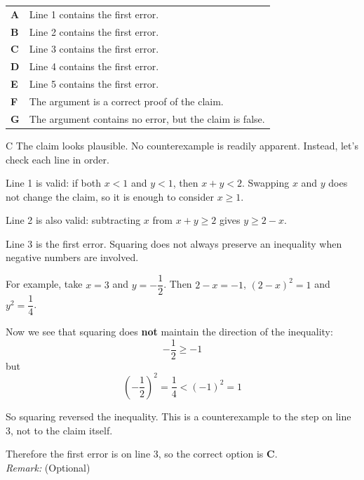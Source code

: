 \documentclass[11pt,a4paper]{article}
\begin{document}
\begin{enumerate}[label=\textbf{\arabic*.},leftmargin=*,itemsep=0pt,start=1]
\par\vspace*{12pt}
\begin{tabularx}{\linewidth}{@{}>{\bfseries}l Y@{}}
A &
Line 1 contains the first error.
\\[0.8em]
B &
Line 2 contains the first error.
\\[0.8em]
C &
Line 3 contains the first error.
\\[0.8em]
D &
Line 4 contains the first error.
\\[0.8em]
E &
Line 5 contains the first error.
\\[0.8em]
F &
The argument is a correct proof of the claim.
\\[0.8em]
G &
The argument contains no error, but the claim is false.
\\
\end{tabularx}

\begin{djsSolution}{C}
The claim looks plausible. No counterexample is readily apparent. Instead, let's check each line in order.

Line 1 is valid: if both $x<1$ and $y<1$, then $x+y<2$. Swapping $x$ and $y$ does not change the claim, so it is enough to consider $x\geq1$. 

Line 2 is also valid: subtracting $x$ from $x+y\geq2$ gives $y\geq2-x$.

Line 3 is the first error. Squaring does not always preserve an inequality when negative numbers are involved. 

For example, take $x=3$ and $y=-\dfrac12$. Then $2-x=-1$, $(2-x)^2=1$ and $y^2=\dfrac{1}{4}$.

Now we see that squaring does \textbf{not} maintain the direction of the inequality:
\[
-\dfrac12\geq-1\]
but
\[
\left(-\dfrac{1}{2}\right)^2=\dfrac14<(-1)^2=1
\]

So squaring reversed the inequality. This is a counterexample to the step on line 3, not to the claim itself.

Therefore the first error is on line 3, so the correct option is \textbf{C}. \\

\textit{Remark:} (Optional)


\end{djsSolution}
\end{enumerate}
\end{document}
